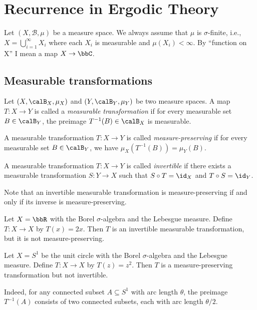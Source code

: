 \section{Recurrence in Ergodic Theory}

Let \((X, \mathcal{B}, \mu)\) be a measure space.
We always assume that \(\mu\) is \(\sigma\)-finite, i.e., \(X = \bigcup_{i=1}^{\infty} X_i\) where each \(X_i\) is measurable and \(\mu(X_i) < \infty\).
By ``function on X'' I mean a map \(X \to \bbC\).

\subsection{Measurable transformations}

    \begin{definition}\label{def:measurable_transformation}
        Let \((X,\calB_X,\mu_X)\) and \((Y,\calB_Y,\mu_Y)\) be two measure spaces.
        A map \(T: X \to Y\) is called a \emph{measurable transformation} if for every measurable set \(B \in \calB_Y\), the preimage \(T^{-1}(B) \in \calB_X\) is measurable.

        A measurable transformation \(T: X \to Y\) is called \emph{measure-preserving} if for every measurable set \(B \in \calB_Y\), we have \(\mu_X(T^{-1}(B)) = \mu_Y(B)\).

        A measurable transformation \(T: X \to Y\) is called \emph{invertible} if there exists a measurable transformation \(S: Y \to X\) such that \(S \circ T = \id_X\) and \(T \circ S = \id_Y\).
    \end{definition}

    Note that an invertible measurable transformation is measure-preserving if and only if its inverse is measure-preserving.

    \begin{example}\label{eg:invertible_measurable_transformation_not_measure_preserving}
        Let \(X = \bbR\) with the Borel \(\sigma\)-algebra and the Lebesgue measure.
        Define \(T: X \to X\) by \(T(x) = 2x\).
        Then \(T\) is an invertible measurable transformation, but it is not measure-preserving.
    \end{example}

    \begin{example}\label{eg:measure_preserving_but_not_invertible}
        Let \(X = S^1\) be the unit circle with the Borel \(\sigma\)-algebra and the Lebesgue measure.
        Define \(T: X \to X\) by \(T(z) = z^2\).
        Then \(T\) is a measure-preserving transformation but not invertible.
        
        Indeed, for any connected subset \(A \subseteq S^1\) with arc length \(\theta\), the preimage \(T^{-1}(A)\) consists of two connected subsets, each with arc length \(\theta/2\).
    \end{example}

